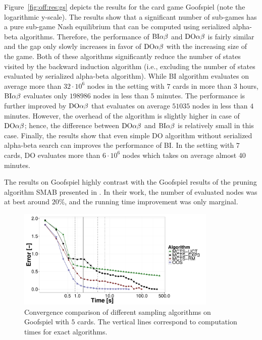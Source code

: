 Figure~\ref{fig:off:res:gs} depicts the results for the card game Goofspiel (note the logarithmic y-scale).
The results show that a significant number of sub-games has a pure sub-game Nash equilibrium that can be computed using serialized alpha-beta algorithms.
Therefore, the performance of $\textrm{BI}\alpha\beta$ and $\textrm{DO}\alpha\beta$ is fairly similar and the gap only slowly increases in favor of $\textrm{DO}\alpha\beta$ with the increasing size of the game.
Both of these algorithms significantly reduce the number of states visited by the backward induction algorithm (i.e., excluding the number of states evaluated by serialized alpha-beta algorithm).
While \textsc{BI} algorithm evaluates on average more than $32\cdot10^6$ nodes in the setting with $7$ cards in more than $3$ hours, $\textrm{BI}\alpha\beta$ evaluates only $198986$ nodes in less than $5$ minutes. 
The performance is further improved by $\textrm{DO}\alpha\beta$ that evaluates on average $51035$ nodes in less than $4$ minutes.
However, the overhead of the algorithm is slightly higher in case of $\textrm{DO}\alpha\beta$; hence, the difference between $\textrm{DO}\alpha\beta$ and $\textrm{BI}\alpha\beta$ is relatively small in this case.
Finally, the results show that even simple \textsc{DO} algorithm without serialized alpha-beta search can improves the performance of \textsc{BI}.
In the setting with $7$ cards, \textsc{DO} evaluates more than $6\cdot10^6$ nodes which takes on average almost 40 minutes.

The results on Goofspiel highly contrast with the Goofspiel results of the pruning algorithm SMAB presented in \cite{Saffidine12SMAB}.
In their work, the number of evaluated nodes was at best around $20\%$, and the running time improvement was only marginal. 

\begin{figure}
\centering
\includegraphics[width=0.85\textwidth]{figures/convergence-gs.pdf}
\caption{Convergence comparison of different sampling algorithms on Goofspiel with $5$ cards. The vertical lines correspond to computation times for exact algorithms.} \label{fig:off:conv:gs}
\end{figure}

